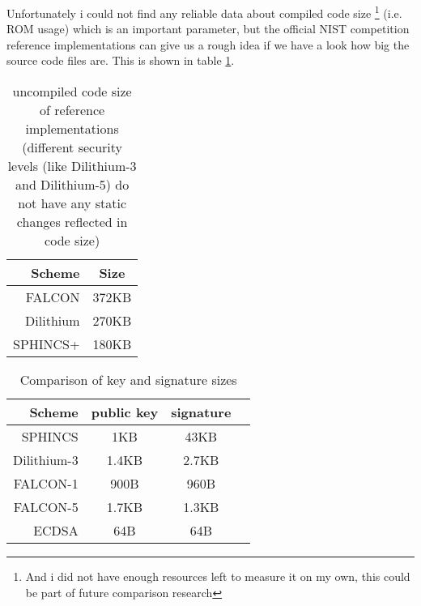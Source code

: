 \documentclass[conference]{IEEEtran}
\begin{document}
Unfortunately i could not find any reliable data about compiled code size \footnote{And i did not have enough resources left to measure it on my own, this could be part of future comparison research} (i.e. ROM usage) which is an important parameter, but the official NIST competition reference implementations \cite{nist_finalists_website} can give us a rough idea if we have a look how big the source code files are. This is shown in table \ref{t:codesize_comp}.

\begin{table}%
    \caption{uncompiled code size of reference implementations (different security levels (like Dilithium-3 and Dilithium-5) do not have any static changes reflected in code size)}
    \label{t:codesize_comp}
    \centering\begin{tabular}{| r | c |}
        \hline
        Scheme & Size\\
        \hline
        FALCON & 372KB \\
        Dilithium & 270KB\\
        SPHINCS+ & 180KB\\

        \hline
    \end{tabular}
\end{table}

\begin{table}%
    \caption{Comparison of key and signature sizes}
    \label{t:key_sig_comp}
    \centering\begin{tabular}{ | r | c c c | }
        \hline
        Scheme & public key & signature \\
        \hline
        SPHINCS     & 1KB   & 43KB \\
        Dilithium-3 & 1.4KB & 2.7KB\\
        FALCON-1    & 900B  & 960B\\
        FALCON-5    & 1.7KB & 1.3KB\\
        \hline
        ECDSA       & 64B   & 64B\\
        \hline
    \end{tabular}
\end{table}
\end{document}
